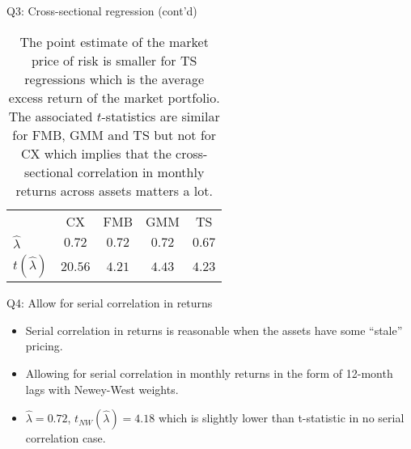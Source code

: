\documentclass[10pt,t]{beamer}
\begin{document}
\begin{frame}{Q3: Cross-sectional regression (cont'd)}
\begin{table}
\begin{tabular}{lcccc}
\toprule
 & CX & FMB & GMM & TS \\
\cmidrule{1-5}
$\hat{\lambda}$ & $0.72$ & $0.72$ & $0.72$ & $0.67$\\
$t(\hat{\lambda})$ & $20.56$ & $4.21$ & $4.43$ & $4.23$\\
\bottomrule
\end{tabular}
\caption{The point estimate of the market price of risk is smaller for TS regressions which is the average excess return of the market portfolio. The associated $t$-statistics are similar for FMB, GMM and TS but not for CX which implies that the cross-sectional correlation in monthly returns across assets matters a lot.}
\end{table}
\end{frame}


\begin{frame}{Q4: Allow for serial correlation in returns}
\begin{itemize}
  \item Serial correlation in returns is reasonable when the assets have some ``stale'' pricing.
  \item Allowing for serial correlation in monthly returns in the form of 12-month lags with Newey-West weights.
  \item $\hat{\lambda} = 0.72$, $t_{NW}(\hat{\lambda}) = 4.18$ which is slightly lower than t-statistic in no serial correlation case.
\end{itemize}
\end{frame}
\end{document}
